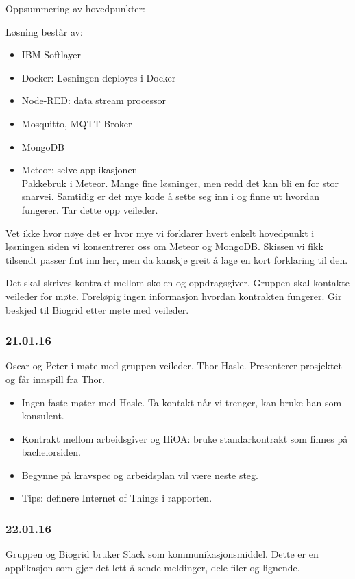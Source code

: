 \documentclass[12pt, oneside]{article}
\begin{document}
Oppsummering av hovedpunkter:

Løsning består av:
\begin{itemize}
	\item IBM Softlayer
	\item Docker: Løsningen deployes i Docker
	\item Node-RED: data stream processor
	\item Mosquitto, MQTT Broker
	\item MongoDB
	\item Meteor: selve applikasjonen\\
	Pakkebruk i Meteor. Mange fine løsninger, men redd det kan bli en for stor snarvei. Samtidig er det mye kode å sette seg inn i og finne ut hvordan 	fungerer. Tar dette opp veileder. 
\end{itemize}
Vet ikke hvor nøye det er hvor mye vi forklarer hvert enkelt hovedpunkt i løsningen siden vi konsentrerer oss om Meteor og MongoDB. Skissen vi fikk tilsendt passer fint inn her, men da kanskje greit å lage en kort forklaring til den.

Det skal skrives kontrakt mellom skolen og oppdragsgiver. Gruppen skal kontakte veileder for møte. Foreløpig ingen informasjon hvordan kontrakten fungerer. Gir beskjed til Biogrid etter møte med veileder. 


\subsubsection{21.01.16}
Oscar og Peter i møte med gruppen veileder, Thor Hasle. Presenterer prosjektet og får innspill fra Thor.
\begin{itemize}
	\item  Ingen faste møter med Hasle. Ta kontakt når vi trenger, kan bruke han som konsulent.
	\item  Kontrakt mellom arbeidsgiver og HiOA: bruke standarkontrakt som finnes på bachelorsiden.
	\item  Begynne på kravspec og arbeidsplan vil være neste steg.
	\item  Tips: definere Internet of Things i rapporten.
\end{itemize}

\subsubsection{22.01.16}
Gruppen og Biogrid bruker Slack som kommunikasjonsmiddel. Dette er en applikasjon som gjør det lett å sende meldinger, dele filer og lignende.
\end{document}
